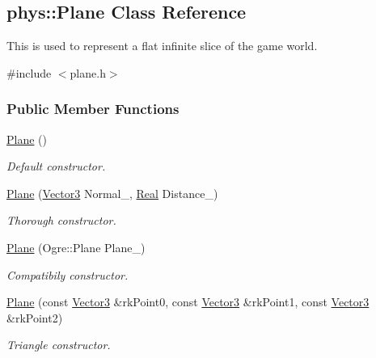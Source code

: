 \hypertarget{classphys_1_1Plane}{
\subsection{phys::Plane Class Reference}
\label{classphys_1_1Plane}
}


This is used to represent a flat infinite slice of the game world.  




{\ttfamily \#include $<$plane.h$>$}

\subsubsection*{Public Member Functions}
\begin{DoxyCompactItemize}
\item 
\hyperlink{classphys_1_1Plane_a8896c8a09a604fff0668e5044889bea7}{Plane} ()
\begin{DoxyCompactList}\small\item\em Default constructor. \item\end{DoxyCompactList}\item 
\hyperlink{classphys_1_1Plane_a921d5668dfee52875ba025528604182f}{Plane} (\hyperlink{classphys_1_1Vector3}{Vector3} Normal\_\-, \hyperlink{namespacephys_af7eb897198d265b8e868f45240230d5f}{Real} Distance\_\-)
\begin{DoxyCompactList}\small\item\em Thorough constructor. \item\end{DoxyCompactList}\item 
\hyperlink{classphys_1_1Plane_aa6c075364461a2996a6575fb022c47a9}{Plane} (Ogre::Plane Plane\_\-)
\begin{DoxyCompactList}\small\item\em Compatibily constructor. \item\end{DoxyCompactList}\item 
\hyperlink{classphys_1_1Plane_a9b0fde4e97a7391259b2e659e46b3c30}{Plane} (const \hyperlink{classphys_1_1Vector3}{Vector3} \&rkPoint0, const \hyperlink{classphys_1_1Vector3}{Vector3} \&rkPoint1, const \hyperlink{classphys_1_1Vector3}{Vector3} \&rkPoint2)
\begin{DoxyCompactList}\small\item\em Triangle constructor. \item\end{DoxyCompactList}\item 

\end{DoxyCompactItemize}
